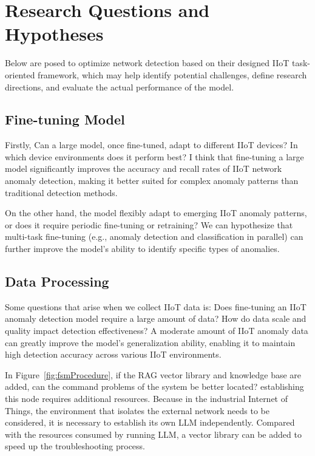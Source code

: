 \documentclass[usenatbib]{tjaa}
\begin{document}
\section{Research Questions and Hypotheses}


Below are posed to optimize network detection based on their designed IIoT task-oriented framework,
which may help identify potential challenges, define research directions,
and evaluate the actual performance of the model.

\subsection{Fine-tuning Model}
Firstly, Can a large model, once fine-tuned, adapt to different IIoT devices?
In which device environments does it perform best?
I think that fine-tuning a large model significantly improves
the accuracy and recall rates of IIoT network anomaly detection,
making it better suited for complex anomaly patterns than traditional detection methods.

On the other hand, the model flexibly adapt to emerging IIoT anomaly patterns,
or does it require periodic fine-tuning or retraining?
We can hypothesize that multi-task fine-tuning (e.g., anomaly detection and classification in parallel)
can further improve the model’s ability to identify specific types of anomalies.

\subsection{Data Processing}
Some questions that arise when we collect IIoT data is:
Does fine-tuning an IIoT anomaly detection model require a large amount of data?
How do data scale and quality impact detection effectiveness?
A moderate amount of IIoT anomaly data can greatly improve the model's generalization ability,
enabling it to maintain high detection accuracy across various IIoT environments.

In Figure~\ref{fig:fsmProcedure}, if the RAG vector library and knowledge base are added,
can the command problems of the system be better located?
establishing this node requires additional resources.
Because in the industrial Internet of Things,
the environment that isolates the external network needs to be considered,
it is necessary to establish its own LLM independently.
Compared with the resources consumed by running LLM,
a vector library can be added to speed up the troubleshooting process.
\end{document}
